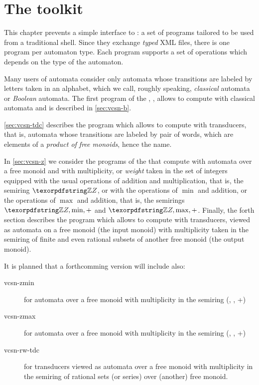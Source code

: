 \chapter{The \Vauc toolkit}
\label{sec:tafkit}

This chapter prevents a simple interface to \Vauc: a set of programs
tailored to be used from a traditional shell.  Since they exchange
\emph{typed} XML files, there is one program per automaton type.  Each
program supports a set of operations which depends on the type of the
automaton.

Many users of automata consider only automata whose transitions are
labeled by letters taken in an alphabet, which we call, roughly
speaking, \emph{classical} automata or \emph{Boolean} automata.  The
first program of the \tafkit, , allows to compute with
classical automata and is described in \autoref{sec:vcsn-b}.

\autoref{sec:vcsn-tdc} describes the program  which
allows to compute with transducers, that is, automata whose
transitions are labeled by pair of words, which are elements of a
\emph{product of free monoids}, hence the name.

In \autoref{sec:vcsn-z} we consider the programs of the \tafkit that
compute with automata over a free monoid and with multiplicity, or
\emph{weight} taken in the set of integers equipped with the usual
operations of addition and multiplication, that is, the semiring $\Z$,
or with the operations of $\min$ and addition, or the operations of
$\max$ and addition, that is, the semirings $\Z,\min,+$ and
$\Z,\max,+$.  Finally, the forth section describes the program
 which allows to compute with transducers, viewed
as automata on a free monoid (the input monoid) with multiplicity
taken in the semiring of finite and even rational subsets of another
free monoid (the output monoid).

\medskip


It is planned that a forthcomming version will include also:

\begin{description}
\item[vcsn-zmin] for automata over a free monoid with multiplicity in
  the semiring (\Z, \min, +)

\item[vcsn-zmax] for automata over a free monoid with multiplicity in the
  semiring (\Z, \max, +)

\item[vcsn-rw-tdc] for transducers viewed as automata over a free
  monoid with multiplicity in the semiring of rational sets (or
  series) over (another) free monoid.
\end{description}

